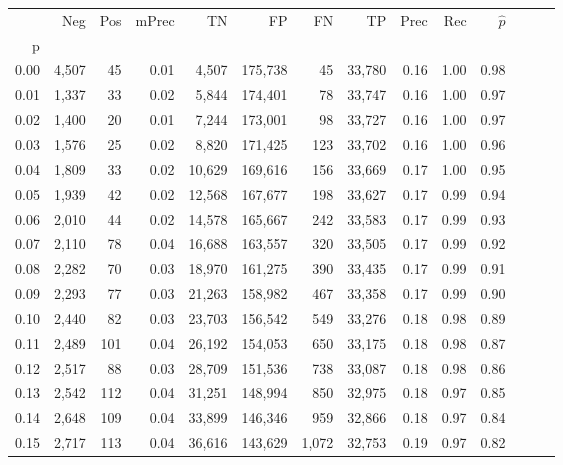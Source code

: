 \begin{tabular}{rrrrrrrrrrrrrr}
\toprule
{} &    Neg &    Pos & mPrec &       TN &       FP &      FN &      TP &  Prec &   Rec & $\hat{p}$ \\
p    &        &        &       &          &          &         &         &       &       &           \\
\midrule
0.00 &  4,507 &     45 &  0.01 &    4,507 &  175,738 &      45 &  33,780 &  0.16 &  1.00 &      0.98 \\
0.01 &  1,337 &     33 &  0.02 &    5,844 &  174,401 &      78 &  33,747 &  0.16 &  1.00 &      0.97 \\
0.02 &  1,400 &     20 &  0.01 &    7,244 &  173,001 &      98 &  33,727 &  0.16 &  1.00 &      0.97 \\
0.03 &  1,576 &     25 &  0.02 &    8,820 &  171,425 &     123 &  33,702 &  0.16 &  1.00 &      0.96 \\
0.04 &  1,809 &     33 &  0.02 &   10,629 &  169,616 &     156 &  33,669 &  0.17 &  1.00 &      0.95 \\
0.05 &  1,939 &     42 &  0.02 &   12,568 &  167,677 &     198 &  33,627 &  0.17 &  0.99 &      0.94 \\
0.06 &  2,010 &     44 &  0.02 &   14,578 &  165,667 &     242 &  33,583 &  0.17 &  0.99 &      0.93 \\
0.07 &  2,110 &     78 &  0.04 &   16,688 &  163,557 &     320 &  33,505 &  0.17 &  0.99 &      0.92 \\
0.08 &  2,282 &     70 &  0.03 &   18,970 &  161,275 &     390 &  33,435 &  0.17 &  0.99 &      0.91 \\
0.09 &  2,293 &     77 &  0.03 &   21,263 &  158,982 &     467 &  33,358 &  0.17 &  0.99 &      0.90 \\
0.10 &  2,440 &     82 &  0.03 &   23,703 &  156,542 &     549 &  33,276 &  0.18 &  0.98 &      0.89 \\
0.11 &  2,489 &    101 &  0.04 &   26,192 &  154,053 &     650 &  33,175 &  0.18 &  0.98 &      0.87 \\
0.12 &  2,517 &     88 &  0.03 &   28,709 &  151,536 &     738 &  33,087 &  0.18 &  0.98 &      0.86 \\
0.13 &  2,542 &    112 &  0.04 &   31,251 &  148,994 &     850 &  32,975 &  0.18 &  0.97 &      0.85 \\
0.14 &  2,648 &    109 &  0.04 &   33,899 &  146,346 &     959 &  32,866 &  0.18 &  0.97 &      0.84 \\
0.15 &  2,717 &    113 &  0.04 &   36,616 &  143,629 &   1,072 &  32,753 &  0.19 &  0.97 &      0.82 \\

\end{tabular}
